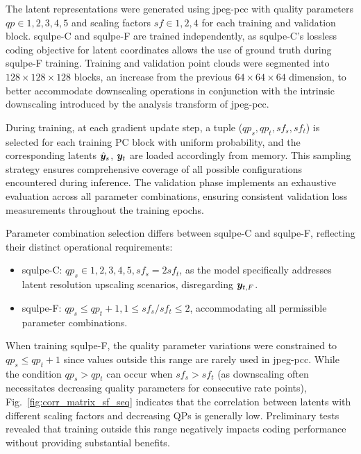 The latent representations were generated using \gls{jpeg-pcc} with quality parameters $qp \in {1, 2, 3, 4, 5}$ and scaling factors $sf \in {1, 2, 4}$ for each training and validation block. \gls{squlpe}-C and \gls{squlpe}-F are trained independently, as \gls{squlpe}-C's lossless coding objective for latent coordinates allows the use of ground truth during \gls{squlpe}-F training. Training and validation point clouds were segmented into $128\times 128\times 128$ blocks, an increase from the previous $64\times 64\times 64$ dimension, to better accommodate downscaling operations in conjunction with the intrinsic downscaling introduced by the analysis transform of \gls{jpeg-pcc}.

During training, at each gradient update step, a tuple ($qp_s, qp_t, sf_s, sf_t$)
is selected for each training PC block with uniform probability, and the
corresponding latents $\hat{\y}_s$, $\y_{t}$ are loaded accordingly from memory. 
This sampling strategy ensures comprehensive coverage of all possible configurations encountered during inference.
The validation phase implements an exhaustive evaluation across all parameter combinations, ensuring consistent validation loss measurements throughout the training epochs. 

Parameter combination selection differs between \gls{squlpe}-C and \gls{squlpe}-F, reflecting their distinct operational requirements:
\begin{itemize}
\item \gls{squlpe}-C: $qp_s \in {1, 2, 3, 4, 5}, sf_s = 2sf_t$, as the model specifically addresses latent resolution upscaling scenarios, disregarding $\y_{t, F}$.
\item \gls{squlpe}-F: $qp_s \leq qp_t + 1, 1\leq sf_s/sf_t \leq 2$, accommodating all permissible parameter combinations.
\end{itemize}

When training \gls{squlpe}-F, the quality parameter variations were constrained to $qp_s \leq qp_t + 1$ since values outside this range are rarely used in \gls{jpeg-pcc}.
While the condition $qp_s > qp_t$ can occur when $sf_s > sf_t$ (as downscaling often necessitates decreasing quality parameters for consecutive rate points), Fig.~\ref{fig:corr_matrix_sf_seq} indicates that the correlation between latents with different scaling factors and decreasing QPs is generally low. Preliminary tests revealed that training outside this range negatively impacts coding performance without providing substantial benefits.

